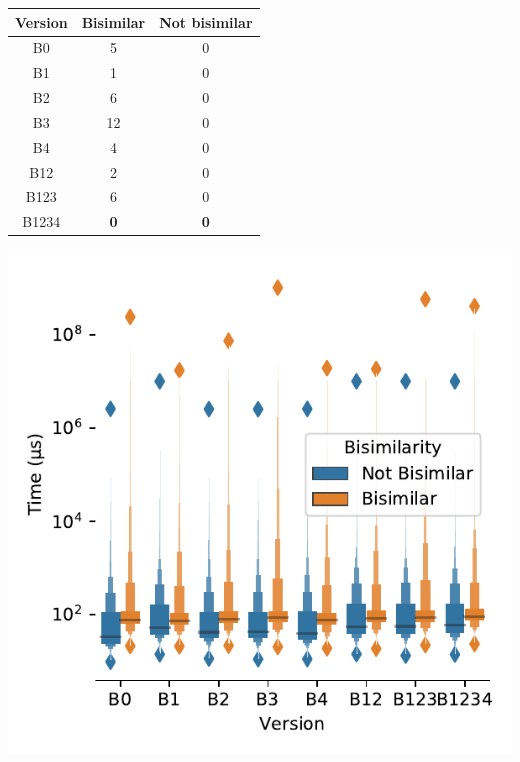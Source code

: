 \noindent
\begin{minipage}[b]{0.49\textwidth}
   {\small 
  \centering
 	\begin{tabular}{ |c|c|c| }
	 \hline
 		Version &  {\color{orange}Bisimilar} & {\color{MidnightBlue}Not bisimilar}  \\ 
 		 \hline
	 	B0 & 5 & 0 \\  
	 	B1 &  1 & 0 \\ 
	 	B2 & 6 & 0 \\ 
	 	B3 &  12 & 0 \\
	 	B4 &  4 & 0 \\
	 	B12 &  2 & 0 \\   
	 	B123 &  6 & 0 \\
	 	B1234 &  \textbf{0} & \textbf{0} \\ 
	 	 \hline  
	\end{tabular}\vspace*{6mm}
	}
	\end{minipage}
	\hfill
\begin{minipage}[b]{0.49\textwidth}
 {\small 
\centering
    \includegraphics[height=.85\textwidth]{img/distribution_boxplot}%
    }
\end{minipage}

